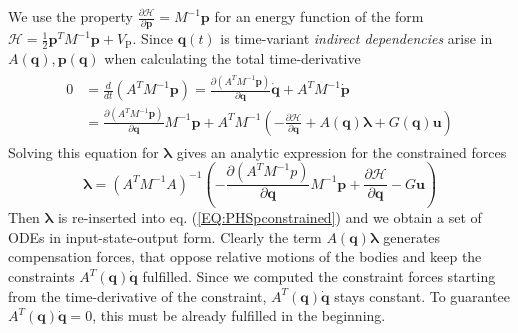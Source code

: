 \documentclass[a4paper,twoside, openright,12pt]{report}
\newcommand{\f}[1]{\boldsymbol{#1}}
\newcommand{\g}[1]{\text{#1}}
\begin{document}
We use the property $\frac{\partial \mathcal{H}}{\partial \f{p}}=M^{-1}\f{p}$ for an energy function of the form $\mathcal{H} = \frac{1}{2}\f{p}^TM^{-1}\f{p} + V_\g{P}$. Since $\f{q}(t)$ is time-variant \emph{indirect dependencies} arise in $A(\f{q}),\f{p}(\f{q})$ when calculating the total time-derivative
\begin{eqnarray}
\begin{aligned}
0 &= \frac{d}{dt}(A^TM^{-1}\f{p}) = \frac{\partial (A^TM^{-1}\f{p})}{\partial \f{q}}\dot{\f{q}} + A^TM^{-1}\dot{\f{p}}  \\
 &= \frac{\partial (A^TM^{-1}\f{p})}{\partial \f{q}}M^{-1}\f{p} + A^TM^{-1}\left(-\frac{\partial \mathcal{H}}{\partial \f{q}}+A(\f{q})\boldsymbol{\lambda} +G(\f{q})\f{u}\right)
\end{aligned}
\end{eqnarray}
Solving this equation for $\boldsymbol{\lambda}$ gives an analytic expression for the constrained forces
\begin{equation}
\boldsymbol{\lambda} = (A^T M^{-1} A)^{-1} \left(-\frac{\partial (A^TM^{-1}p)}{\partial \f{q}}M^{-1}\f{p} + \frac{\partial \mathcal{H}}{\partial \f{q}} - G\f{u}\right)
\end{equation}
Then $\boldsymbol{\lambda}$ is re-inserted into eq. (\ref{EQ:PHSpconstrained}) and we obtain a set of ODEs in input-state-output form. Clearly the term $A(\f{q})\boldsymbol{\lambda}$ generates compensation forces, that oppose relative motions of the bodies and keep the constraints $A^T(\f{q})\dot{\f{q}}$ fulfilled. Since we computed the constraint forces starting from the time-derivative of the constraint, $A^T(\f{q})\dot{\f{q}}$ stays constant. To guarantee $A^T(\f{q})\dot{\f{q}}=0$, this must be already fulfilled in the beginning.
\end{document}
